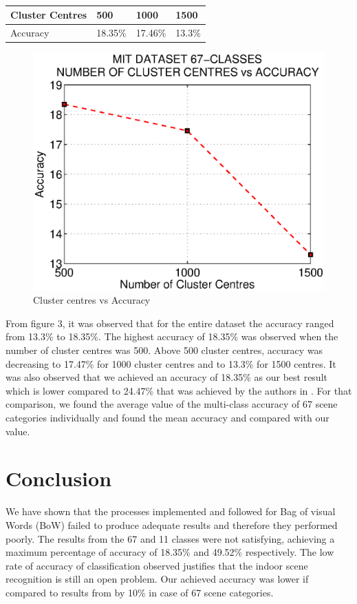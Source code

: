 \documentclass[10pt,twocolumn,letterpaper]{article}
\begin{document}
\begin{table}[h]
\caption{}
\begin{tabular}{|l|l|l|l|}
\hline
Cluster Centres & 500 & 1000 & 1500 \\ \hline
Accuracy & 18.35\% & 17.46\% & 13.3\% \\ \hline
\end{tabular}
\end{table}
\begin{figure}[h]
      \centering
      \includegraphics[width=0.8\linewidth]{img/67c.eps}
      \caption{Cluster centres vs Accuracy}
\end{figure}
From figure 3, it was observed that for the entire dataset the accuracy ranged from 13.3\% to 18.35\%. The highest accuracy of 18.35\% was observed when the number of cluster centres was 500. Above 500 cluster centres, accuracy was decreasing to 17.47\% for 1000 cluster centres and to 13.3\% for 1500 centres.  It was also observed that we achieved an accuracy of 18.35\% as our best result which is lower compared to 24.47\% that was achieved by the authors in \cite{indoorScenes}. For that comparison, we found the average value of the multi-class accuracy of 67 scene categories individually and found the mean accuracy and compared with our value. 

\section{Conclusion}
We have shown that the processes implemented and followed for Bag of visual Words (BoW) failed to produce adequate results and therefore they performed poorly.
The results from the 67  and 11 classes were not satisfying, achieving a maximum percentage of accuracy of 18.35\% and 49.52\% respectively. The low rate of accuracy of classification observed justifies that the indoor scene recognition is still an open problem. Our achieved accuracy was lower if compared to results from \cite{indoorScenes}  by 10\% in case of 67 scene categories.
{\small


}
\end{document}
